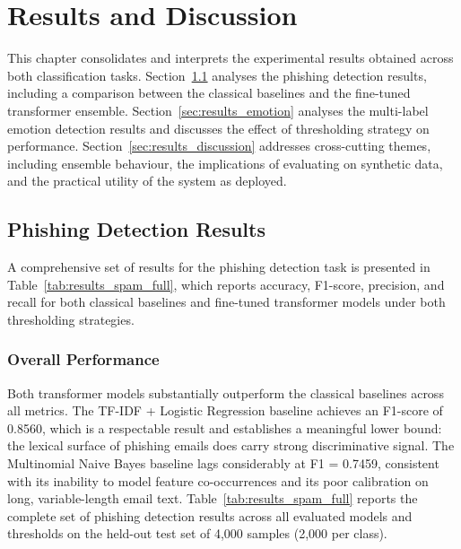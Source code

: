 \chapter{Results and Discussion}
\label{chapter:results}

This chapter consolidates and interprets the experimental results obtained across both classification tasks. Section~\ref{sec:results_spam} analyses the phishing detection results, including a comparison between the classical baselines and the fine-tuned transformer ensemble. Section~\ref{sec:results_emotion} analyses the multi-label emotion detection results and discusses the effect of thresholding strategy on performance. Section~\ref{sec:results_discussion} addresses cross-cutting themes, including ensemble behaviour, the implications of evaluating on synthetic data, and the practical utility of the system as deployed.

\section{Phishing Detection Results}
\label{sec:results_spam}

A comprehensive set of results for the phishing detection task is presented in Table~\ref{tab:results_spam_full}, which reports accuracy, F1-score, precision, and recall for both classical baselines and fine-tuned transformer models under both thresholding strategies.

\subsection{Overall Performance}

Both transformer models substantially outperform the classical baselines across all metrics. The TF-IDF + Logistic Regression baseline achieves an F1-score of 0.8560, which is a respectable result and establishes a meaningful lower bound: the lexical surface of phishing emails does carry strong discriminative signal. The Multinomial Naive Bayes baseline lags considerably at F1 = 0.7459, consistent with its inability to model feature co-occurrences and its poor calibration on long, variable-length email text. Table~\ref{tab:results_spam_full} reports the complete set of phishing detection results across all evaluated models and thresholds on the held-out test set of 4,000 samples (2,000 per class).


